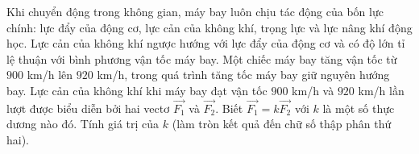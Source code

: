\begin{ex}%
	Khi chuyển động trong không gian, máy bay luôn chịu tác động của bốn lực chính: lực đẩy của động cơ, lực cản của không khí, trọng lực và lực nâng khí động học. Lực cản của không khí ngược hướng với lực đẩy của động cơ và có độ lớn tỉ lệ thuận với bình phương vận tốc máy bay. Một chiếc máy bay tăng vận tốc từ $900$ km/h lên $920$ km/h, trong quá trình tăng tốc máy bay giữ nguyên hướng bay. Lực cản của không khí khi máy bay đạt vận tốc $900$ km/h và $920$ km/h lần lượt được biểu diễn bởi hai vectơ $\overrightarrow{F_1}$ và $\overrightarrow{F_2}$. Biết $\overrightarrow{F_1}=k \overrightarrow{F_2}$ với $k$ là một số thực dương nào đó. Tính giá trị của $k$ (làm tròn kết quả đến chữ số thập phân thứ hai).
	\begin{center}
\end{center}
\end{ex}
